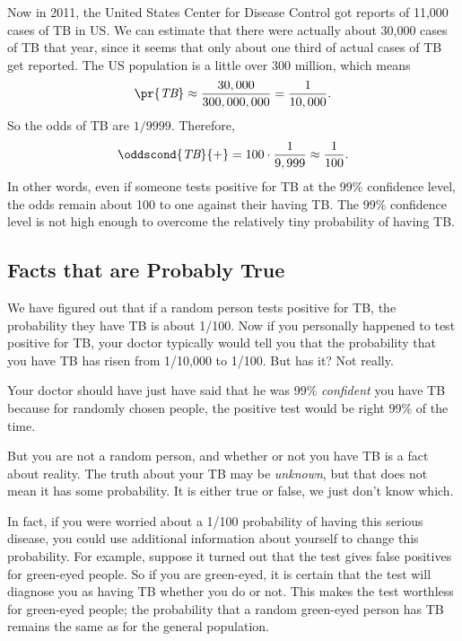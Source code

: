 Now in 2011, the United States Center for Disease Control got reports
of 11,000 cases of TB in US.  We can estimate that there were actually
about 30,000 cases of TB that year, since it seems that only about one
third of actual cases of TB get reported.  The US population is a
little over 300 million, which means
\[
\pr{\TB} \approx \frac{30,000}{300,000,000} = \frac{1}{10,000}.
\]
So the odds of TB are $1/9999$.  Therefore,
\[
\oddscond{\TB}{\text+} = 100 \cdot \frac{1}{9,999} \approx \frac{1}{100}.
\]
In other words, even if someone tests positive for TB at the 99\%
confidence level, the odds remain about 100 to one against their
having TB.  The 99\% confidence level is not high enough to overcome
the relatively tiny probability of having TB.

\subsection{Facts that are Probably True}
We have figured out that if a random person tests positive for TB, the
probability they have TB is about 1/100.  Now if you personally happened
to test positive for TB, your doctor typically would tell you that the
probability that you have TB has risen from 1/10,000 to 1/100.  But
has it?  Not really.

Your doctor should have just have said that he was 99\%
\emph{confident} you have TB because for randomly chosen people, the
positive test would be right 99\% of the time.

 \iffalse So either you have TB or something unlikely
(probability 1/100) happened, namely, the test gave a false positive.
But outcomes that are unlikely for a random person may not be unlikely
for you.  \fi

But you are not a random person, and whether or not you have TB is a
fact about reality.  The truth about your TB may be \emph{unknown},
but that does not mean it has some probability.  It is either true or
false, we just don't know which.

In fact, if you were worried about a 1/100 probability of having this
serious disease, you could use additional information about yourself
to change this probability.  For example, suppose it turned out that
the test gives false positives for green-eyed people.  So if you are
green-eyed, it is certain that the test will diagnose you as having TB
whether you do or not.  This makes the test worthless for green-eyed
people; the probability that a random green-eyed person has TB remains
the same as for the general population.

